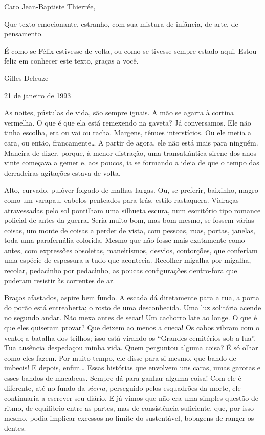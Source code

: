 Caro Jean-Baptiste Thierrée,

Que texto emocionante, estranho, com sua mistura de infância, de arte,
de pensamento.

É como se Félix estivesse de volta, ou como se tivesse sempre estado
aqui. Estou feliz em conhecer este texto, graças a você.

Gilles Deleuze

21 de janeiro de 1993

As noites, pústulas de vida, são sempre iguais. A mão se agarra à
cortina vermelha. O que é que ela está remexendo na gaveta? Já
conversamos. Ele não tinha escolha, era ou vai ou racha. Margens, tênues
interstícios. Ou ele metia a cara, ou então, francamente\ldots{} A partir de
agora, ele não está mais para ninguém. Maneira de dizer, porque, à menor
distração, uma transatlântica sirene dos anos vinte começava a gemer e,
aos poucos, ia se formando a ideia de que o tempo das derradeiras
agitações estava de volta.

Alto, curvado, pulôver folgado de malhas largas. Ou, se preferir,
baixinho, magro como um varapau, cabelos penteados para trás, estilo
rastaquera. Vidraças atravessadas pelo sol pontilham uma silhueta
escura, num escritório tipo romance policial de antes da guerra. Seria
muito bom, mas bom mesmo, se fossem várias coisas, um monte de coisas a
perder de vista, com pessoas, ruas, portas, janelas, toda uma
parafernália colorida. Mesmo que não fosse mais exatamente como antes,
com expressões obsoletas, maneirismos, desvios, contorções, que
conferiam uma espécie de espessura a tudo que acontecia. Recolher
migalha por migalha, recolar, pedacinho por pedacinho, as poucas
configurações dentro-fora que puderam resistir às correntes de ar.

Braços afastados, aspire bem fundo. A escada dá diretamente para a rua,
a porta do porão está entreaberta; o rosto de uma desconhecida. Uma luz
solitária acende no segundo andar. Não mexa antes de secar! Um cachorro
late ao longe. O que é que eles quiseram provar? Que deixem ao menos a
cueca! Os cabos vibram com o vento; a batalha dos trilhos; isso está
virando os ``Grandes cemitérios sob a lua''. Tua ausência despedaçou
minha vida. Quem perguntou alguma coisa? É só olhar como eles fazem. Por
muito tempo, ele disse para si mesmo, que bando de imbecis! E depois,
enfim\ldots{} Essas histórias que envolvem uns caras, umas garotas e esses
bandos de macabeus. Sempre dá para ganhar alguma coisa! Com ele é
diferente, até no fundo da \emph{sierra}, perseguido pelos esquadrões da
morte, ele continuaria a escrever seu diário. E já vimos que não era uma
simples questão de ritmo, de equilíbrio entre as partes, mas de
consistência suficiente, que, por isso mesmo, podia implicar excessos no
limite do sustentável, bobagens de ranger os dentes.

